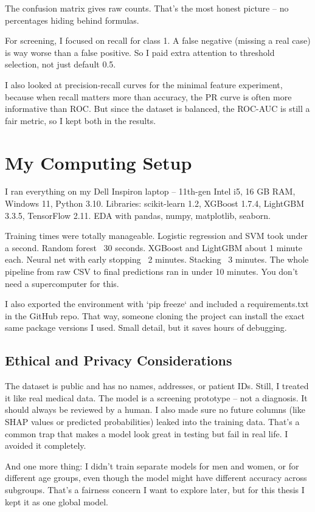 \documentclass[12pt, a4paper, oneside]{book}
\begin{document}
The confusion matrix gives raw counts. That's the most honest picture – no percentages hiding behind formulas.

For screening, I focused on recall for class 1. A false negative (missing a real case) is way worse than a false positive. So I paid extra attention to threshold selection, not just default 0.5.

I also looked at precision-recall curves for the minimal feature experiment, because when recall matters more than accuracy, the PR curve is often more informative than ROC. But since the dataset is balanced, the ROC-AUC is still a fair metric, so I kept both in the results.

\section{My Computing Setup}
I ran everything on my Dell Inspiron laptop – 11th-gen Intel i5, 16 GB RAM, Windows 11, Python 3.10. Libraries: scikit-learn 1.2, XGBoost 1.7.4, LightGBM 3.3.5, TensorFlow 2.11. EDA with pandas, numpy, matplotlib, seaborn.

Training times were totally manageable. Logistic regression and SVM took under a second. Random forest ~30 seconds. XGBoost and LightGBM about 1 minute each. Neural net with early stopping ~2 minutes. Stacking ~3 minutes. The whole pipeline from raw CSV to final predictions ran in under 10 minutes. You don't need a supercomputer for this.

I also exported the environment with `pip freeze` and included a requirements.txt in the GitHub repo. That way, someone cloning the project can install the exact same package versions I used. Small detail, but it saves hours of debugging.

\subsection{Ethical and Privacy Considerations}
The dataset is public and has no names, addresses, or patient IDs. Still, I treated it like real medical data. The model is a screening prototype – not a diagnosis. It should always be reviewed by a human. I also made sure no future columns (like SHAP values or predicted probabilities) leaked into the training data. That's a common trap that makes a model look great in testing but fail in real life. I avoided it completely.

And one more thing: I didn't train separate models for men and women, or for different age groups, even though the model might have different accuracy across subgroups. That's a fairness concern I want to explore later, but for this thesis I kept it as one global model.
\end{document}
